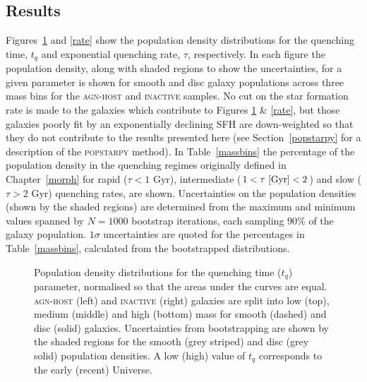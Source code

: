 \subsection{Results}\label{results}

Figures~\ref{time} and \ref{rate} show the population density distributions for the quenching time, $t_q$ and exponential quenching rate, $\tau$, respectively. In each figure the population density, along with shaded regions to show the uncertainties, for a given parameter is shown for smooth and disc galaxy populations across three mass bins for the \textsc{agn-host} and \textsc{inactive} samples. No cut on the star formation rate is made to the galaxies which contribute to Figures \ref{time} \& \ref{rate}, but those galaxies poorly fit by an exponentially declining SFH are down-weighted so that they do not contribute to the results presented here (see Section~\ref{popstarpy} for a description of the \textsc{popstarpy} method). In Table~\ref{massbins} the percentage of the  population density in the quenching regimes originally defined in Chapter~\ref{morph} for rapid ($\tau < 1$ Gyr), intermediate ($1 < \tau ~\rm{[Gyr]} < 2$) and slow ($\tau > 2$ Gyr) quenching rates, are shown. Uncertainties on the population densities (shown by the shaded regions) are determined from the maximum and minimum values spanned by $N = 1000$ bootstrap iterations, each sampling $90\%$ of the galaxy population. $1\sigma$ uncertainties are quoted for the percentages in Table~\ref{massbins}, calculated from the bootstrapped distributions.


\begin{figure}
\caption[Quenching time population density distributions for the \textsc{agn-host} and \textsc{inactive} samples] {Population density distributions for the quenching time ($t_q$) parameter, normalised so that the areas under the curves are equal. \textsc{agn-host} (left) and \textsc{inactive} (right) galaxies are split into low (top), medium (middle) and high (bottom) mass for smooth (dashed) and disc (solid) galaxies. Uncertainties from bootstrapping are shown by the shaded regions for the smooth (grey striped) and disc (grey solid) population densities. A low (high) value of $t_q$ corresponds to the early (recent) Universe.}
\label{time}
\end{figure}


